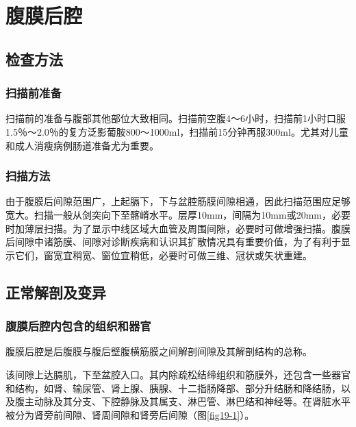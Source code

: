 \chapter{腹膜后腔}

\section{检查方法}

\subsection{扫描前准备}

扫描前的准备与腹部其他部位大致相同。扫描前空腹4～6小时，扫描前1小时口服1.5％～2.0％的复方泛影葡胺800～1000ml，扫描前15分钟再服300ml。尤其对儿童和成人消瘦病例肠道准备尤为重要。

\subsection{扫描方法}

由于腹膜后间隙范围广，上起膈下，下与盆腔筋膜间隙相通，因此扫描范围应足够宽大。扫描一般从剑突向下至髂嵴水平。层厚10mm，间隔为10mm或20mm，必要时加薄层扫描。为了显示中线区域大血管及周围间隙，必要时可做增强扫描。腹膜后间隙中诸筋膜、间隙对诊断疾病和认识其扩散情况具有重要价值，为了有利于显示它们，窗宽宜稍宽、窗位宜稍低，必要时可做三维、冠状或矢状重建。

\section{正常解剖及变异}

\subsection{腹膜后腔内包含的组织和器官}

腹膜后腔是后腹膜与腹后壁腹横筋膜之间解剖间隙及其解剖结构的总称。

该间隙上达膈肌，下至盆腔入口。其内除疏松结缔组织和筋膜外，还包含一些器官和结构，如肾、输尿管、肾上腺、胰腺、十二指肠降部、部分升结肠和降结肠，以及腹主动脉及其分支、下腔静脉及其属支、淋巴管、淋巴结和神经等。在肾脏水平被分为肾旁前间隙、肾周间隙和肾旁后间隙（图\ref{fig19-1}）。

